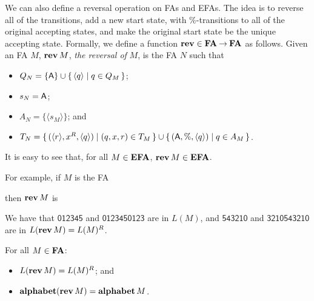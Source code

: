 We can also define a reversal operation on FAs and EFAs.  The idea is
to reverse all of the transitions, add a new start state, with
$\%$-transitions to all of the original accepting states, and make the
original start state be the unique accepting state.  Formally, we
define a function $\mathbf{rev}\in\mathbf{FA}\mathbin{\to}\mathbf{FA}$ as
%
%
%
%
%
%
%
follows.
Given an FA $M$, $\mathbf{rev}\,M$, \emph{the reversal of} $M$,
is the FA $N$ such that
\begin{itemize}
\item $Q_N=\{\mathsf{A}\}\cup\{ \, \langle q\rangle \mid q\in Q_M \, \}$;

\item $s_N=\mathsf{A}$;

\item $A_N=\{\langle s_M\rangle\}$; and

\item $T_N=\{ \, (\langle r\rangle, x^R, \langle q\rangle) \mid (q, x, r)\in T_M \, \} \cup
\{ \, (\mathsf{A}, \%, \langle q\rangle) \mid q\in A_M \, \}$.
\end{itemize}
It is easy to see that, for all $M\in\mathbf{EFA}$, $\mathbf{rev}\,M\in\mathbf{EFA}$.

For example, if $M$ is the FA
\begin{center}

\end{center}
then $\mathbf{rev}\,M$ is
\begin{center}

\end{center}
We have that $\mathsf{012345}$ and $\mathsf{0123450123}$ are in $L(M)$,
and $\mathsf{543210}$ and $\mathsf{3210543210}$ are in $L(\mathbf{rev}\,M)=L(M)^R$.

\begin{theorem}
\label{FARev}
For all $M\in\mathbf{FA}$:
\begin{itemize}
\item $L(\mathbf{rev}\,M) = L(M)^R$; and

\item $\mathbf{alphabet}(\mathbf{rev}\,M) = \mathbf{alphabet}\,M$.
\end{itemize}
\end{theorem}

